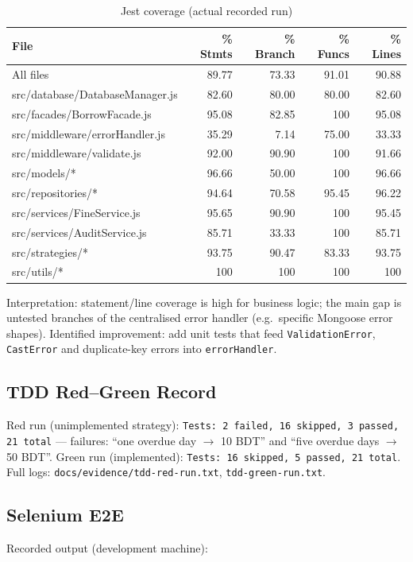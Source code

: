 \documentclass[12pt,a4paper]{article}
\begin{document}
\begin{table}[H]
\centering
\caption{Jest coverage (actual recorded run)}
\small
\begin{tabular}{lrrrr}
\toprule
File & \% Stmts & \% Branch & \% Funcs & \% Lines \\
\midrule
All files & 89.77 & 73.33 & 91.01 & 90.88 \\
src/database/DatabaseManager.js & 82.60 & 80.00 & 80.00 & 82.60 \\
src/facades/BorrowFacade.js & 95.08 & 82.85 & 100 & 95.08 \\
src/middleware/errorHandler.js & 35.29 & 7.14 & 75.00 & 33.33 \\
src/middleware/validate.js & 92.00 & 90.90 & 100 & 91.66 \\
src/models/* & 96.66 & 50.00 & 100 & 96.66 \\
src/repositories/* & 94.64 & 70.58 & 95.45 & 96.22 \\
src/services/FineService.js & 95.65 & 90.90 & 100 & 95.45 \\
src/services/AuditService.js & 85.71 & 33.33 & 100 & 85.71 \\
src/strategies/* & 93.75 & 90.47 & 83.33 & 93.75 \\
src/utils/* & 100 & 100 & 100 & 100 \\
\bottomrule
\end{tabular}
\end{table}

Interpretation: statement/line coverage is high for business logic; the main
gap is untested branches of the centralised error handler (e.g.\ specific
Mongoose error shapes). Identified improvement: add unit tests that feed
\texttt{ValidationError}, \texttt{CastError} and duplicate-key errors into
\texttt{errorHandler}.

\subsection{TDD Red--Green Record}
\label{app:tdd}
Red run (unimplemented strategy): \texttt{Tests: 2 failed, 16 skipped,
3 passed, 21 total} — failures: ``one overdue day $\rightarrow$ 10 BDT'' and
``five overdue days $\rightarrow$ 50 BDT''. Green run (implemented):
\texttt{Tests: 16 skipped, 5 passed, 21 total}. Full logs:
\texttt{docs/evidence/tdd-red-run.txt}, \texttt{tdd-green-run.txt}.

\subsection{Selenium E2E}
\label{app:e2e}
Recorded output (development machine):
\end{document}

